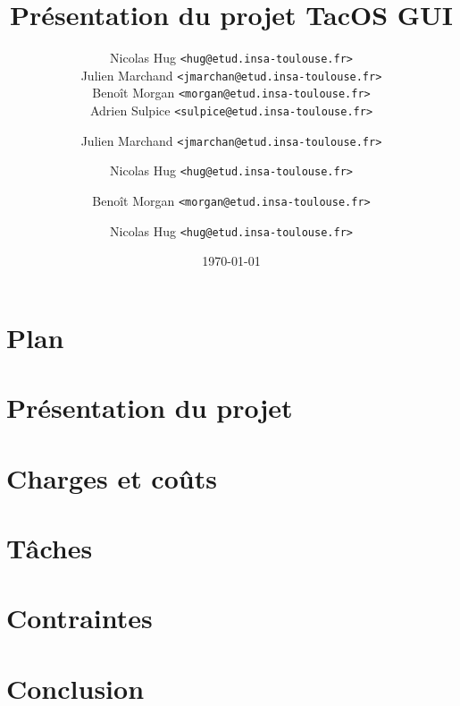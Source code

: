 \documentclass[xcolor=table,12pt]{beamer}
\title{Présentation du projet TacOS GUI}
\author[TacOS GUI Team (hug, jmarchan, morgan, sulpice)]{Nicolas Hug \texttt{<hug@etud.insa-toulouse.fr>}\\
Julien Marchand \texttt{<jmarchan@etud.insa-toulouse.fr>}\\
Benoît Morgan \texttt{<morgan@etud.insa-toulouse.fr>}\\
Adrien Sulpice \texttt{<sulpice@etud.insa-toulouse.fr>}}
\institute{INSA de Toulouse}
\date{\today}
\begin{document}

\frame{\titlepage}

\section[Plan]{Plan}
\frame{
  \scriptsize
  \tableofcontents
  \normalsize
}

\section{Présentation du projet}

\author{Julien Marchand \texttt{<jmarchan@etud.insa-toulouse.fr>}}
\section{Charges et coûts}

\author{Nicolas Hug \texttt{<hug@etud.insa-toulouse.fr>}}
\section{Tâches}

\author{Benoît Morgan \texttt{<morgan@etud.insa-toulouse.fr>}}
\section{Contraintes}

\section{Conclusion}
\author{Nicolas Hug \texttt{<hug@etud.insa-toulouse.fr>}}

\end{document}
